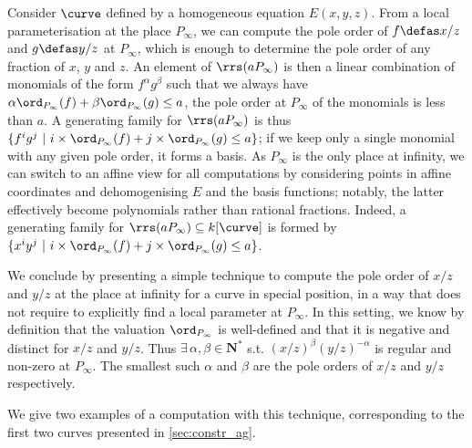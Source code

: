 Consider $\curve$ defined by a homogeneous equation $E(x,y,z)$. From a local parameterisation at the place $P_\infty$, we can compute the pole order of
$f \defas x/z$ and $g \defas y/z$ at $P_\infty$, which is enough to determine the pole
order of any fraction of $x$, $y$ and $z$.
An element of $\rrs(aP_\infty)$ is then a linear combination of monomials of the form $f^{\alpha}g^{\beta}$ such that
we always have
$\alpha\ord_{P_\infty}(f) + \beta\ord_{P_\infty}(g) \leq a$, \ie the pole order at $P_\infty$ of the monomials is less
than $a$.
A generating family for $\rrs(aP_\infty)$ is thus
$\{f^ig^j~|~i\times\ord_{P_\infty}(f) + j\times\ord_{P_\infty}(g) \leq a\}$; if we keep only a single monomial
with any given pole order, it forms a basis.
As $P_\infty$ is the only place at infinity, we can switch to an affine view for all computations by considering points in affine coordinates and dehomogenising $E$ and the basis functions; notably, the latter effectively become polynomials rather
than rational fractions. Indeed, a generating family
for $\rrs(aP_\infty) \subseteq k[\curve]$ is formed by $\{x^iy^j~|~i\times\ord_{P_\infty}(f) + j\times\ord_{P_\infty}(g) \leq a\}$.

\medskip

We conclude by presenting a simple technique to compute the pole order of $x/z$ and $y/z$ at the place at infinity for a curve in special position,
in a way that does not require to explicitly find a local parameter at $P_\infty$.
In this setting, we know by definition that the valuation $\ord_{P_\infty}$ is well-defined and that it is negative and distinct for $x/z$ and $y/z$.
Thus $\exists\, \alpha,\beta \in \mathbf{N}^*$ s.t. $(x/z)^\beta(y/z)^{-\alpha}$ is regular and non-zero at $P_\infty$. The smallest such $\alpha$
and $\beta$ are the pole orders of $x/z$ and $y/z$ respectively.

We give two examples of a computation with this technique, corresponding to the first two curves presented in \autoref{sec:constr_ag}.

